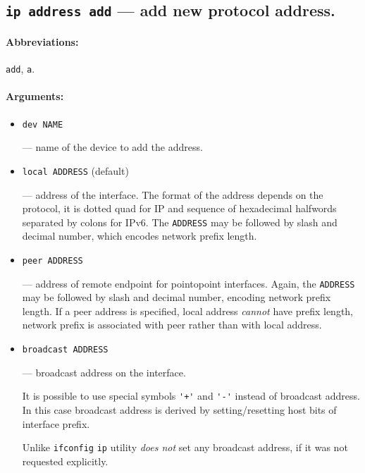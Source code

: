 \subsection{{\tt ip address add} --- add new protocol address.}
\label{IP-ADDR-ADD}

\paragraph{Abbreviations:} \verb|add|, \verb|a|.

\paragraph{Arguments:}

\begin{itemize}
\item \verb|dev NAME|

\noindent--- name of the device to add the address.

\item \verb|local ADDRESS| (default)

--- address of the interface. The format of the address depends
on the protocol, it is dotted quad for IP and sequence of hexadecimal halfwords
separated by colons for IPv6. The \verb|ADDRESS| may be followed by
slash and decimal number, which encodes network prefix length.


\item \verb|peer ADDRESS|

--- address of remote endpoint for pointopoint interfaces.
Again, the \verb|ADDRESS| may be followed by slash and decimal number,
encoding network prefix length. If a peer address is specified,
local address {\em cannot\/} have prefix length, network prefix is associated
with peer rather than with local address.


\item \verb|broadcast ADDRESS|

--- broadcast address on the interface.

It is possible to use special symbols \verb|'+'| and \verb|'-'|
instead of broadcast address. In this case broadcast address
is derived by setting/resetting host bits of interface prefix.

\vskip 1mm
\begin{NB}
Unlike \verb|ifconfig| \verb|ip| utility {\em does not\/} set any broadcast
address, if it was not requested explicitly.
\end{NB}



\end{itemize}
